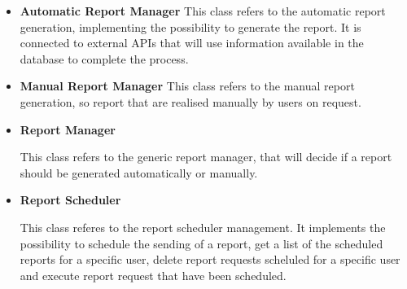 \documentclass{article}
\begin{document}
\begin{itemize}

\item \textbf{Automatic Report Manager}
This class refers to the automatic report generation, implementing the possibility to generate the report. It is connected to external APIs that will use information available in the database to complete the process.

\item \textbf{Manual Report Manager}
This class refers to the manual report generation, so report that are realised manually by users on request.

\item \textbf{Report Manager}

This class refers to the generic report manager, that will decide if a report should be generated automatically or manually.

\item \textbf{Report Scheduler}

This class referes to the report scheduler management. It implements the possibility to schedule the sending of a report, get a list of the scheduled reports for a specific user, delete report requests scheluled for a specific user and execute report request that have been scheduled.

\end{itemize}
\end{document}
